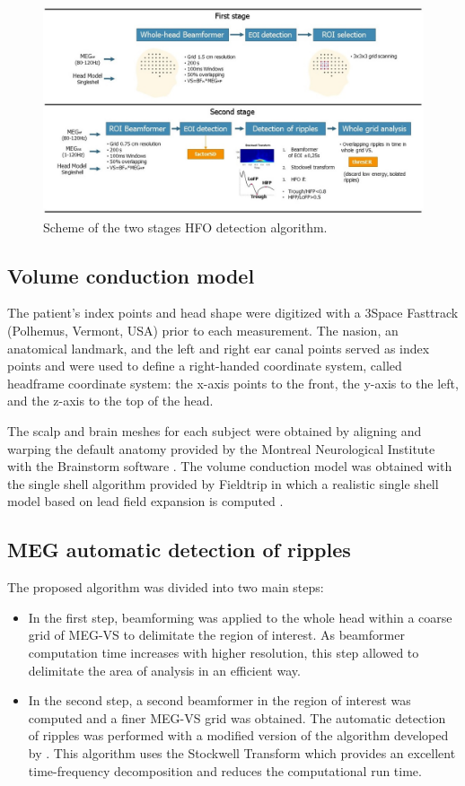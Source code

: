 \begin{figure}[h]
\centering
\includegraphics[width=1\textwidth]{Images/fig3-1.JPG}
\caption{Scheme of the two stages HFO detection algorithm.}
\label{fig:3-1}
\end{figure} 

\subsection{Volume conduction model}

The patient’s index points and head shape were digitized with a 3Space Fasttrack (Polhemus, Vermont, USA) prior to each measurement. The nasion, an anatomical landmark, and the left and right ear canal points served as index points and were used to define a right-handed coordinate system, called headframe coordinate system: the x-axis points to the front, the y-axis to the left, and the z-axis to the top of the head. 

The scalp and brain meshes for each subject were obtained by aligning and warping the default anatomy provided by the Montreal Neurological Institute with the Brainstorm software \citep{Tadel2011}. The volume conduction model was obtained with the single shell algorithm provided by Fieldtrip in which a realistic single shell model based on lead field expansion is computed \citep{Nolte2003}.  

\subsection{MEG automatic detection of ripples}

The proposed algorithm was divided into two main steps: 

\begin{itemize}
\item In the first step, beamforming was applied to the whole head within a coarse grid of MEG-VS to delimitate the region of interest. As beamformer computation time increases with higher resolution, this step allowed to delimitate the area of analysis in an efficient way.
\item In the second step, a second beamformer in the region of interest was computed and a finer MEG-VS grid was obtained. The automatic detection of ripples was performed with a modified version of the algorithm developed by \citep{Burnos2014}. This algorithm uses the Stockwell Transform \citep{Stockwell1996} which provides an excellent time-frequency decomposition and reduces the computational run time.  
\end{itemize}

